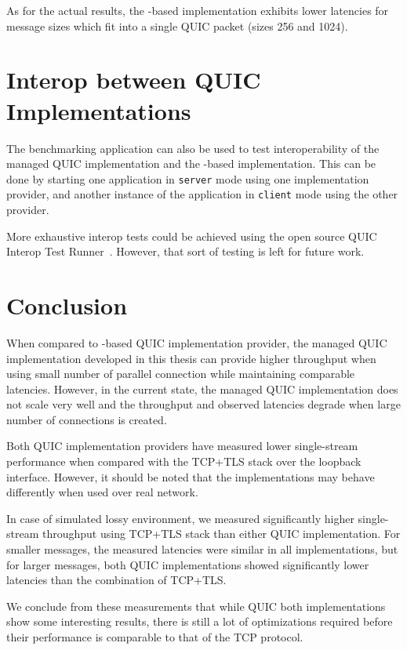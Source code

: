 As for the actual results, the \libmsquic{}-based
implementation exhibits lower latencies for message sizes which fit into a single QUIC packet (sizes
\SI{256}{\byte} and \SI{1024}{\byte}).

\section{Interop between QUIC Implementations}

The benchmarking application can also be used to test interoperability of the managed QUIC
implementation and the \libmsquic{}-based implementation. This can be done by starting one
application in \texttt{server} mode using one implementation provider, and another instance of the
application in \texttt{client} mode using the other provider.

More exhaustive interop tests could be achieved using the open source QUIC Interop Test
Runner~\cite{QuicInteropRunner}. However, that sort of testing is left for future work.

\section{Conclusion}


When compared to \libmsquic{}-based QUIC implementation provider, the managed QUIC implementation
developed in this thesis can provide higher throughput when using small number of parallel
connection while maintaining comparable latencies. However, in the current state, the managed QUIC
implementation does not scale very well and the throughput and observed latencies degrade when large
number of connections is created.

Both QUIC implementation providers have measured lower single-stream performance when compared with
the TCP+TLS stack over the loopback interface. However, it should be noted that the implementations
may behave differently when used over real network.

In case of simulated lossy environment, we measured significantly higher single-stream throughput
using TCP+TLS stack than either QUIC implementation. For smaller messages, the measured latencies
were similar in all implementations, but for larger messages, both QUIC implementations showed
significantly lower latencies than the combination of TCP+TLS\@.

We conclude from these measurements that while QUIC both implementations show some interesting
results, there is still a lot of optimizations required before their performance is comparable to
that of the TCP protocol.
